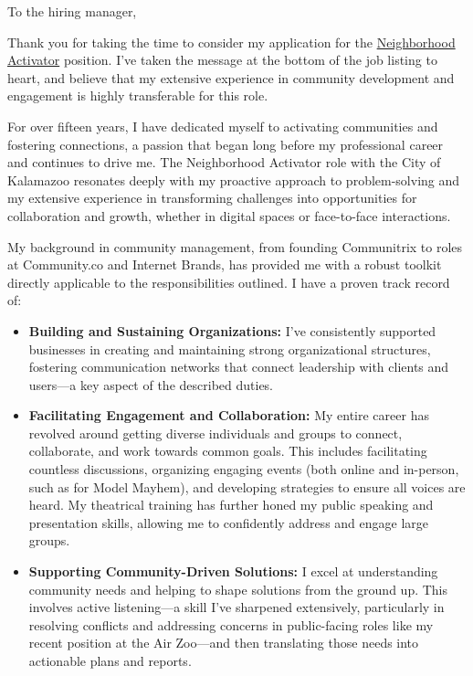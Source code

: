 \documentclass[11pt]{letter} %
\date{June 12, 2025 \vspace{-48pt}} %
\begin{document}
\begin{letter}{}
	\opening{To the hiring manager,}

	Thank you for taking the time to consider my application for the \href{https://www.governmentjobs.com/careers/kalamazoomi/jobs/4962381/neighborhood-activator?pagetype=jobOpportunitiesJobs}{Neighborhood Activator} position. I've taken the message at the bottom of the job listing to heart, and believe that my extensive experience in community development and engagement is highly transferable for this role. 

	For over fifteen years, I have dedicated myself to activating communities and fostering connections, a passion that began long before my professional career and continues to drive me. The Neighborhood Activator role with the City of Kalamazoo resonates deeply with my proactive approach to problem-solving and my extensive experience in transforming challenges into opportunities for collaboration and growth, whether in digital spaces or face-to-face interactions.

	My background in community management, from founding Communitrix to roles at Community.co and Internet Brands, has provided me with a robust toolkit directly applicable to the responsibilities outlined. I have a proven track record of:
	\begin{itemize}
    \item \textbf{Building and Sustaining Organizations:} I've consistently supported businesses in creating and maintaining strong organizational structures, fostering communication networks that connect leadership with clients and users—a key aspect of the described duties.
    \item \textbf{Facilitating Engagement and Collaboration:} My entire career has revolved around getting diverse individuals and groups to connect, collaborate, and work towards common goals. This includes facilitating countless discussions, organizing engaging events (both online and in-person, such as for Model Mayhem), and developing strategies to ensure all voices are heard. My theatrical training has further honed my public speaking and presentation skills, allowing me to confidently address and engage large groups.
    \item \textbf{Supporting Community-Driven Solutions:} I excel at understanding community needs and helping to shape solutions from the ground up. This involves active listening—a skill I've sharpened extensively, particularly in resolving conflicts and addressing concerns in public-facing roles like my recent position at the Air Zoo—and then translating those needs into actionable plans and reports.
	\end{itemize}


\end{letter}
\end{document}
